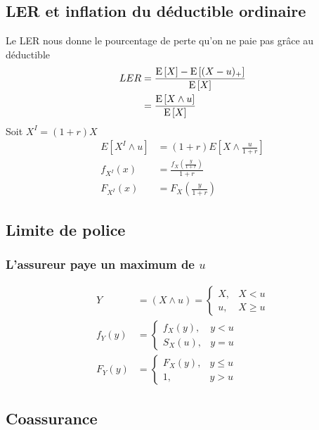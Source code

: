 \documentclass[10pt, french]{article}
\begin{document}
\begin{multicols*}{3}
\subsection*{LER et inflation du déductible ordinaire}
Le LER nous donne le pourcentage de perte qu'on ne paie pas grâce au déductible
\begin{align*}
	LER 	 &= \frac{\mathrm{E} \left[ X \right] - \mathrm{E} \left[ (X-u)_+ \right]}{\mathrm{E} \left[ X \right]} \\
	     &= \frac{\mathrm{E} \left[ X \wedge u \right]}{\mathrm{E} \left[ X \right]} 
\end{align*}
Soit $X^I = (1 + r) X$
\begin{align*}
	E[{X^I} \wedge u]	 &= (1 + r) E[X \wedge \frac{u}{1 + r}] \\
	f_{X^I}(x) &= \frac{f_X\left(\frac{y}{1 + r}\right)}{1 + r} \\
	F_{X^I}(x) &= F_X\left(\frac{y}{1 + r}\right)
\end{align*}

\subsection*{Limite de police}
\subsubsection*{L'assureur paye un maximum de $u$}

\begin{align*}
Y 	&= (X \wedge u)
	= 
	\left\{
		\begin{array}{ll}
			X, & X < u \\
			u, & X \geq u
		\end{array}
	\right. \\
f_Y(y) &=
		\left\{
			\begin{array}{ll}
				f_X(y), & y < u \\
				S_X(u), & y = u
			\end{array}
		\right. \\
F_Y(y) &=
		\left\{
			\begin{array}{ll}
				F_X(y), & y \leq u \\
				1, & y > u
			\end{array}
		\right. 
\end{align*}

\subsection*{Coassurance}

\end{multicols*}
\end{document}
